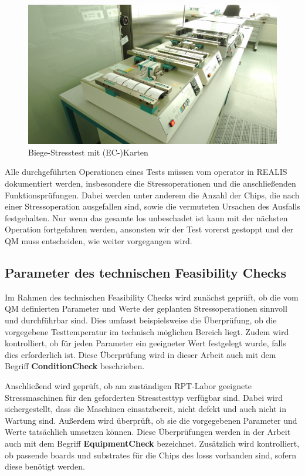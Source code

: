 \begin{figure}[!htbp]
    \centering
    \includegraphics[width=1\textwidth]{bilder/stresstest-card1.png}
    \caption{Biege-Stresstest mit (EC-)Karten \cite{RPTLaborIntern}}
    \label{fig:stresstest-card}
\end{figure}

Alle durchgeführten Operationen eines Tests müssen vom \gls{operator} in \gls{REALIS} dokumentiert werden, insbesondere die Stressoperationen und die anschließenden Funktionsprüfungen. Dabei werden unter anderem die Anzahl der Chips, die nach einer Stressoperation ausgefallen sind, sowie die vermuteten Ursachen des Ausfalls festgehalten.
Nur wenn das gesamte \gls{los} unbeschadet ist kann mit der nächsten Operation fortgefahren werden, ansonsten wir der Test vorerst gestoppt und der \gls{QM} muss entscheiden, wie weiter vorgegangen wird.

\subsection{Parameter des technischen Feasibility Checks}\label{Subsec:ParameterdestechnischenFeasibilityChecks}

Im Rahmen des technischen Feasibility Checks wird zunächst geprüft, ob die vom \gls{QM} definierten Parameter und Werte der geplanten Stressoperationen sinnvoll und durchführbar sind. Dies umfasst beispielsweise die Überprüfung, ob die vorgegebene Testtemperatur im technisch möglichen Bereich liegt. Zudem wird kontrolliert, ob für jeden Parameter ein geeigneter Wert festgelegt wurde, falls dies erforderlich ist. Diese Überprüfung wird in dieser Arbeit auch mit dem Begriff \textbf{\gls{ConditionCheck}} beschrieben.

Anschließend wird geprüft, ob am zuständigen \gls{RPT}-Labor geeignete Stressmaschinen für den geforderten Stresstesttyp verfügbar sind. Dabei wird sichergestellt, dass die Maschinen einsatzbereit, nicht defekt und auch nicht in Wartung sind. Außerdem wird überprüft, ob sie die vorgegebenen Parameter und Werte tatsächlich umsetzen können. Diese Überprüfungen werden in der Arbeit auch mit dem Begriff \textbf{\gls{EquipmentCheck}} bezeichnet.
Zusätzlich wird kontrolliert, ob passende \glspl{board} und \glspl{substrate} für die Chips des \glspl{los}s vorhanden sind, sofern diese benötigt werden.

